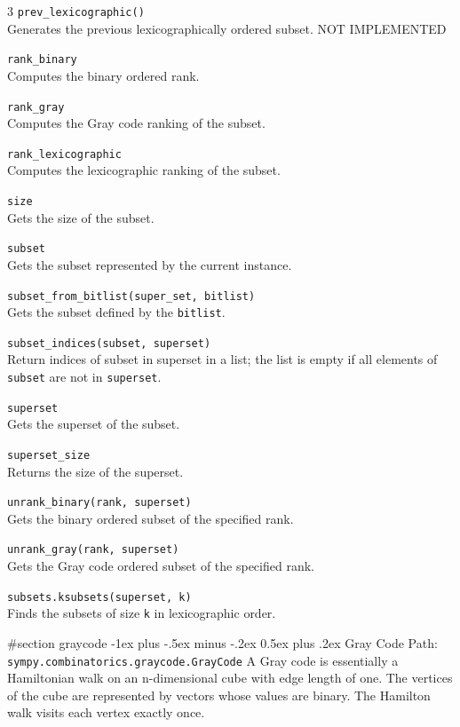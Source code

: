\documentclass[10pt,landscape]{article}
\makeatletter
\renewcommand{\section}{\@startsection{section}{1}{0mm}%
                                {-1ex plus -.5ex minus -.2ex}%
                                {0.5ex plus .2ex}%
                                {\normalfont\large\bfseries}}
\makeatother
\begin{document}
\begin{multicols}{3}
\verb!prev_lexicographic()!\\
Generates the previous lexicographically ordered subset. NOT IMPLEMENTED

\verb!rank_binary!\\
Computes the binary ordered rank.



\verb!rank_gray!\\
Computes the Gray code ranking of the subset.


\verb!rank_lexicographic!\\
Computes the lexicographic ranking of the subset.



\verb!size!\\
Gets the size of the subset.



\verb!subset!\\
Gets the subset represented by the current instance.


\verb!subset_from_bitlist(super_set, bitlist)!\\
Gets the subset defined by the \verb!bitlist!.



\verb!subset_indices(subset, superset)!\\
Return indices of subset in superset in a list;
the list is empty if all elements of \verb!subset! are not in \verb!superset!.


\verb!superset!\\
Gets the superset of the subset.


\verb!superset_size!\\
Returns the size of the superset.


\verb!unrank_binary(rank, superset)!\\
Gets the binary ordered subset of the specified rank.



\verb!unrank_gray(rank, superset)!\\
Gets the Gray code ordered subset of the specified rank.



\verb!subsets.ksubsets(superset, k)!\\
Finds the subsets of size \verb!k! in lexicographic order.

#section graycode
\section{Gray Code}
Path: \verb!sympy.combinatorics.graycode.GrayCode!
A Gray code is essentially a Hamiltonian walk on an n-dimensional
 cube with edge length of one. The vertices of the cube are
 represented by vectors whose values are binary.
 The Hamilton walk visits each vertex exactly once.


\end{multicols}
\end{document}
